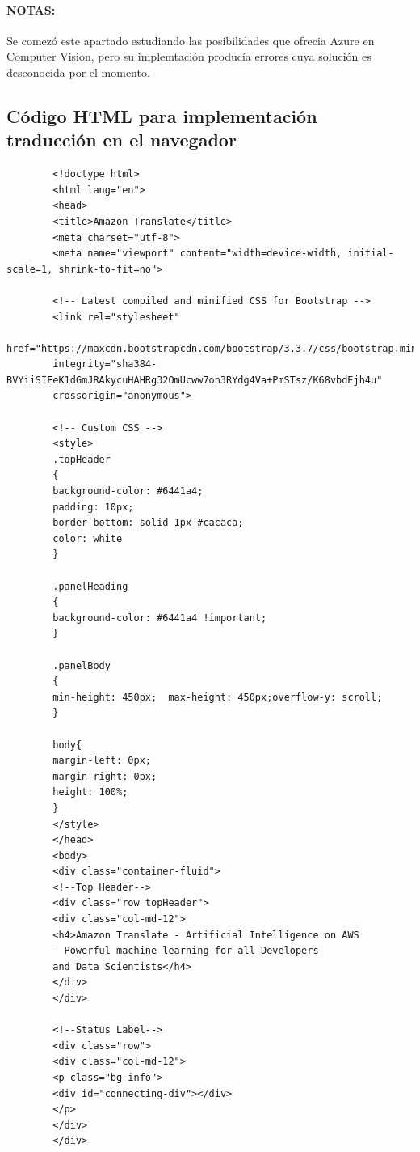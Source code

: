 \documentclass[english,runningheads,a4paper]{llncs}[2018/03/10]
\begin{document}
    
    \paragraph{NOTAS:} Se comezó este apartado estudiando las posibilidades que ofrecia Azure en Computer Vision, pero su implemtación producía errores cuya solución es desconocida por el momento.
    

    
    \newpage

    \subsection{Código HTML para implementación traducción en el navegador}
        \begin{verbatim}
        <!doctype html>
        <html lang="en">
        <head>
        <title>Amazon Translate</title>
        <meta charset="utf-8">
        <meta name="viewport" content="width=device-width, initial-scale=1, shrink-to-fit=no">
        
        <!-- Latest compiled and minified CSS for Bootstrap -->
        <link rel="stylesheet"
        href="https://maxcdn.bootstrapcdn.com/bootstrap/3.3.7/css/bootstrap.min.css"
        integrity="sha384-BVYiiSIFeK1dGmJRAkycuHAHRg32OmUcww7on3RYdg4Va+PmSTsz/K68vbdEjh4u" 
        crossorigin="anonymous">
        
        <!-- Custom CSS -->
        <style>
        .topHeader
        {
        background-color: #6441a4;
        padding: 10px;
        border-bottom: solid 1px #cacaca;
        color: white
        }
        
        .panelHeading
        {
        background-color: #6441a4 !important;
        }
        
        .panelBody
        {
        min-height: 450px;  max-height: 450px;overflow-y: scroll;
        }
        
        body{
        margin-left: 0px;
        margin-right: 0px;
        height: 100%;
        }
        </style>
        </head>
        <body>
        <div class="container-fluid">
        <!--Top Header-->
        <div class="row topHeader">
        <div class="col-md-12">
        <h4>Amazon Translate - Artificial Intelligence on AWS
        - Powerful machine learning for all Developers 
        and Data Scientists</h4>
        </div>
        </div>
        
        <!--Status Label-->
        <div class="row">
        <div class="col-md-12">
        <p class="bg-info">
        <div id="connecting-div"></div>
        </p>
        </div>
        </div>
        

\end{verbatim}
\end{document}
